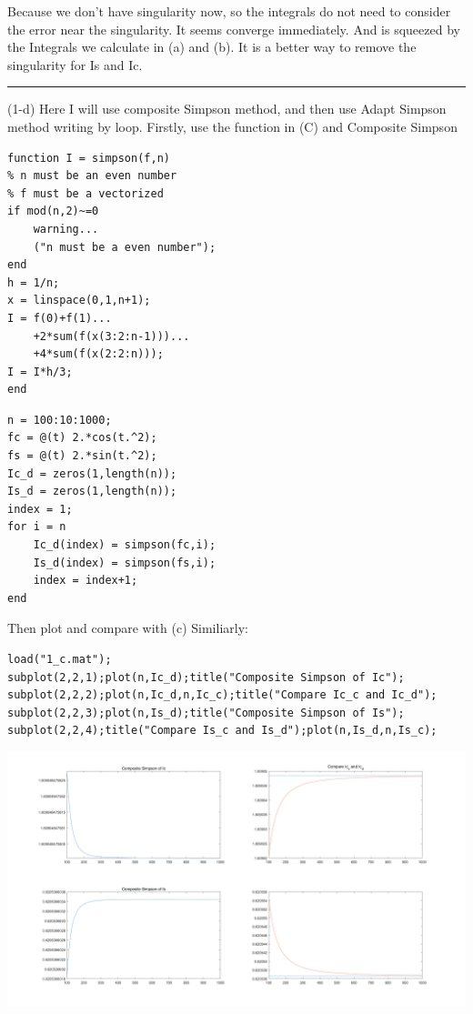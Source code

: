 \documentclass{article}
\begin{document}
\begin{flushleft}
\begin{enumerate}
\begin{framed}
Because we don't have singularity now, so the integrals do not need to consider the error near the singularity.
It seems converge immediately. And is squeezed by the Integrals we calculate in (a) and (b).
\newline
It is a better way to remove the singularity for Is and Ic.
\newpage
\rule[-0.7mm]{45em}{0.5pt}
\newline
(1-d)
\newline
Here I will use composite Simpson method, and then use Adapt Simpson method writing by loop.
\newline
Firstly, use the function in (C) and Composite Simpson
\begin{multicols}{2}
\begin{verbatim}
function I = simpson(f,n)
% n must be an even number
% f must be a vectorized
if mod(n,2)~=0
    warning...
    ("n must be a even number");
end
h = 1/n;
x = linspace(0,1,n+1);
I = f(0)+f(1)...
    +2*sum(f(x(3:2:n-1)))...
    +4*sum(f(x(2:2:n)));
I = I*h/3;
end
\end{verbatim}
\columnbreak
\begin{verbatim}
n = 100:10:1000;
fc = @(t) 2.*cos(t.^2);
fs = @(t) 2.*sin(t.^2);
Ic_d = zeros(1,length(n));
Is_d = zeros(1,length(n));
index = 1;
for i = n
    Ic_d(index) = simpson(fc,i);
    Is_d(index) = simpson(fs,i);
    index = index+1;
end
\end{verbatim}
\end{multicols}
Then plot and compare with (c) Similiarly:
\begin{verbatim}
load("1_c.mat");
subplot(2,2,1);plot(n,Ic_d);title("Composite Simpson of Ic");
subplot(2,2,2);plot(n,Ic_d,n,Ic_c);title("Compare Ic_c and Ic_d");
subplot(2,2,3);plot(n,Is_d);title("Composite Simpson of Is");
subplot(2,2,4);title("Compare Is_c and Is_d");plot(n,Is_d,n,Is_c);
\end{verbatim}
\includegraphics[width={\linewidth}]{Q1_d_CS.png}


\end{framed}
\end{enumerate}
\end{flushleft}
\end{document}
